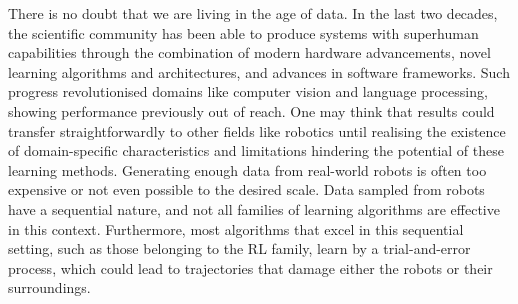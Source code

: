 
{}

\begingroup
\let\clearpage\relax
\let\cleardoublepage\relax
\let\cleardoublepage\relax

\thispagestyle{plain}
\vspace*{-2.2cm}

\begin{center}

    \vspace*{0.2cm}

    {\color{CTtitle}\spacedallcaps{\myTitle}}

    {
    \color{darkgray}
    \vspace*{0.2cm}

    \spacedlowsmallcaps{\myName}
    \vspace*{-3mm}

    \vspace*{-3mm}

    \spacedlowsmallcaps{\myTime}
    }

    \vspace*{0.3cm}
\end{center}


\noindent
There is no doubt that we are living in the age of data.
In the last two decades, the scientific community has been able to produce systems with superhuman capabilities through the combination of modern hardware advancements, novel learning algorithms and architectures, and advances in software frameworks.
Such progress revolutionised domains like computer vision and language processing, showing performance previously out of reach.
One may think that results could transfer straightforwardly to other fields like robotics until realising the existence of domain-specific characteristics and limitations hindering the potential of these learning methods.
Generating enough data from real-world robots is often too expensive or not even possible to the desired scale.
Data sampled from robots have a sequential nature, and not all families of learning algorithms are effective in this context.
Furthermore, most algorithms that excel in this sequential setting, such as those belonging to the \ac{RL} family, learn by a trial-and-error process, which could lead to trajectories that damage either the robots or their surroundings.

